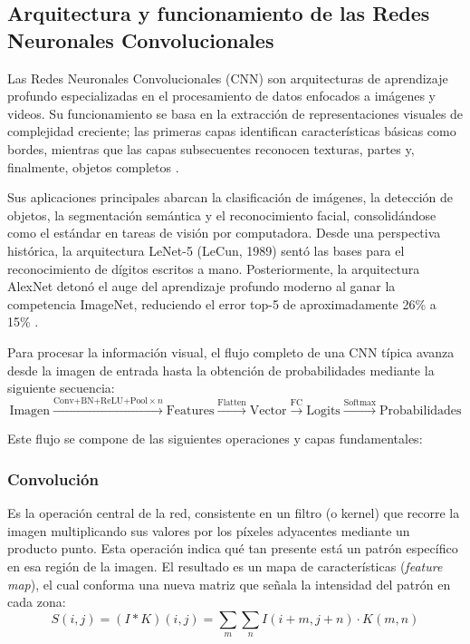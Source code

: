 
\subsection{Arquitectura y funcionamiento de las Redes Neuronales Convolucionales}
\label{sec:cnn_fundamentos}

Las Redes Neuronales Convolucionales (CNN) son arquitecturas de aprendizaje profundo especializadas en el procesamiento de datos enfocados a imágenes y videos. Su funcionamiento se basa en la extracción de representaciones visuales de complejidad creciente; las primeras capas identifican características básicas como bordes, mientras que las capas subsecuentes reconocen texturas, partes y, finalmente, objetos completos \cite{goodfellow2016deep}.

Sus aplicaciones principales abarcan la clasificación de imágenes, la detección de objetos, la segmentación semántica y el reconocimiento facial, consolidándose como el estándar en tareas de visión por computadora. Desde una perspectiva histórica, la arquitectura LeNet-5 (LeCun, 1989) sentó las bases para el reconocimiento de dígitos escritos a mano. Posteriormente, la arquitectura AlexNet detonó el auge del aprendizaje profundo moderno al ganar la competencia ImageNet, reduciendo el error top-5 de aproximadamente 26\% a 15\% \cite{krizhevsky2012imagenet}. 

Para procesar la información visual, el flujo completo de una CNN típica avanza desde la imagen de entrada hasta la obtención de probabilidades mediante la siguiente secuencia:
\begin{equation}
\text{Imagen} \xrightarrow{\text{Conv+BN+ReLU+Pool} \times n} \text{Features} \xrightarrow{\text{Flatten}} \text{Vector} \xrightarrow{\text{FC}} \text{Logits} \xrightarrow{\text{Softmax}} \text{Probabilidades}
\end{equation}

Este flujo se compone de las siguientes operaciones y capas fundamentales:

\subsubsection{Convolución}
Es la operación central de la red, consistente en un filtro (o kernel) que recorre la imagen multiplicando sus valores por los píxeles adyacentes mediante un producto punto. Esta operación indica qué tan presente está un patrón específico en esa región de la imagen. El resultado es un mapa de características (\textit{feature map}), el cual conforma una nueva matriz que señala la intensidad del patrón en cada zona:
\begin{equation}
S(i,j) = (I * K)(i,j) = \sum_m \sum_n I(i+m, j+n) \cdot K(m,n)
\end{equation}

